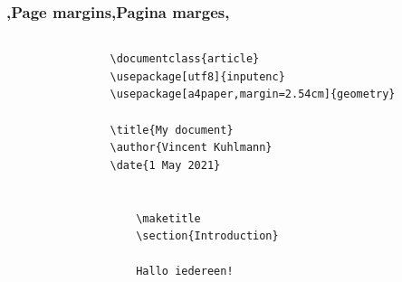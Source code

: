 \begin{frame}[fragile]
    \frametitle{\lang,Page margins,Pagina marges,}
    \begin{columns}
        \begin{column}{0.67\textwidth}
            \begin{verbatim}
                \documentclass{article}
                \usepackage[utf8]{inputenc}
                \usepackage[a4paper,margin=2.54cm]{geometry}
                
                \title{My document}
                \author{Vincent Kuhlmann}
                \date{1 May 2021}
                
                
                    \maketitle
                    \section{Introduction}
                    
                    Hallo iedereen!
                

\end{verbatim}
\end{column}
\end{columns}
\end{frame}
